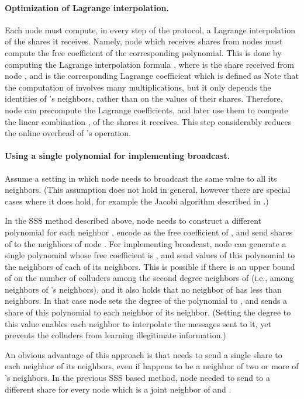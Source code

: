 \documentclass[10pt]{svjour3}
\begin{document}
\paragraph{Optimization of Lagrange interpolation.}
Each node must compute, in every step of the protocol, a Lagrange
interpolation of the shares it receives. Namely, node  which
receives shares from nodes  must compute the free
coefficient of the corresponding polynomial. This is done by computing
the Lagrange interpolation formula ,
where  is the share received from node , and 
is the corresponding Lagrange coefficient which is defined as
 Note that the computation of
 involves many multiplications, but it only depends the
identities of 's neighbors, rather than on the values of their
shares. Therefore, node  can precompute the Lagrange coefficients,
and later use them to compute the linear combination , of the shares it receives. This step considerably reduces the
online overhead of 's operation.

\paragraph{Using a single polynomial for implementing broadcast.}
Assume a setting in which node  needs to broadcast the same value 
to all its neighbors. (This assumption does not hold in general, however
there are special cases where it does hold, for example the Jacobi algorithm described in .)

In the SSS method described above, node  needs to construct a
different polynomial  for each neighbor , encode  as the
free coefficient of , and send shares of  to the neighbors
of node . For implementing broadcast, node  can generate a single polynomial whose
free coefficient is , and send values of this polynomial to the
neighbors of each of its neighbors. This is possible if there is an
upper bound of  on the number of colluders among the second
degree neighbors of  (i.e., among neighbors of 's neighbors),
and it also holds that no neighbor of  has less than 
neighbors. In that case node  sets the degree of the polynomial to
, and sends a share of this polynomial to each neighbor of its
neighbor. (Setting the degree to this value enables each neighbor to
interpolate the messages sent to it, yet prevents the colluders from
learning illegitimate information.)

An obvious  advantage of this approach is that 
needs to send a single share to each neighbor  of its neighbors,
even if  happens to be a neighbor of two or more of 's
neighbors. In the previous SSS based method, node  needed to send
to  a different share for every node  which is a joint neighbor
of  and .
\end{document}
